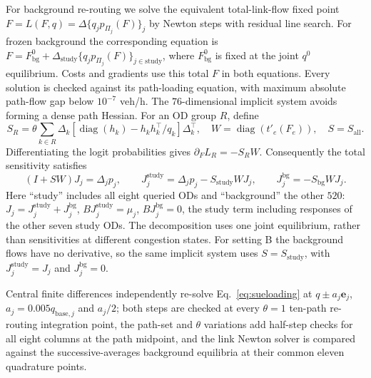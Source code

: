 For background re-routing we solve the equivalent total-link-flow fixed
point $F=L(F,q)=\Delta\{q_jp_{\Pi_j}(F)\}_j$ by Newton steps with residual
line search. For frozen background the corresponding equation is
$F=F_{\mathrm{bg}}^0+\Delta_{\mathrm{study}}
\{q_jp_{\Pi_j}(F)\}_{j\in\mathrm{study}}$, where $F_{\mathrm{bg}}^0$
is fixed at the joint $q^0$ equilibrium. Costs and gradients use this
total $F$ in both equations. Every solution is checked against its path-loading
equation, with maximum absolute path-flow gap below $10^{-7}$ veh/h.
The $76$-dimensional implicit system avoids forming a dense path Hessian.
For an OD group $R$, define
\[
S_R=\theta\sum_{k\in R}\Delta_k
\left[\operatorname{diag}(h_k)-h_kh_k^\top/q_k\right]\Delta_k^\top,
\quad W=\operatorname{diag}(t'_e(F_e)),\quad S=S_{\mathrm{all}}.
\]
Differentiating the logit probabilities gives
$\partial_F L_R=-S_RW$. Consequently the total sensitivity satisfies
\begin{equation}
(I+SW)J_j=\Delta_jp_j,\qquad
J_j^{\mathrm{study}}=\Delta_jp_j-S_{\mathrm{study}}WJ_j,\qquad
J_j^{\mathrm{bg}}=-S_{\mathrm{bg}}WJ_j.
\label{eq:bg_sensitivity}
\end{equation}
Here ``study'' includes all eight queried ODs and ``background'' the
other $520$: $J_j=J_j^{\mathrm{study}}+J_j^{\mathrm{bg}}$,
$BJ_j^{\mathrm{study}}=\mu_j$, $BJ_j^{\mathrm{bg}}=0$, the study
term including responses of the other seven study ODs. The
decomposition uses one joint equilibrium, rather than sensitivities
at different congestion states.
For setting B the background flows have no derivative, so the same
implicit system uses $S=S_{\mathrm{study}}$, with
$J_j^{\mathrm{study}}=J_j$ and $J_j^{\mathrm{bg}}=0$.

Central finite differences independently re-solve Eq.~\eqref{eq:sueloading}
at $q\pm a_j\mathbf e_j$, $a_j=0.005q_{\mathrm{base},j}$ and
$a_j/2$; both steps are checked at every $\theta=1$ ten-path
re-routing integration point, the path-set and $\theta$ variations
add half-step checks for all eight columns at the path midpoint, and
the link Newton solver is compared against the successive-averages
background equilibria at their common eleven quadrature points.

